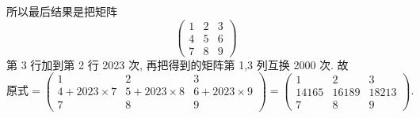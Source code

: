 \documentclass[../../main.tex]{subfiles}
\begin{document}
\begin{solution}
所以最后结果是把矩阵
\[
\begin{pmatrix} 
1 & 2 & 3 \\
4 & 5 & 6 \\
7 & 8 & 9 
\end{pmatrix}
\]
第 3 行加到第 2 行 2023 次, 再把得到的矩阵第 1,3 列互换 2000 次. 故
\[
\text{原式} = \begin{pmatrix} 
1 & 2 & 3 \\
4 + 2023 \times 7 & 5 + 2023 \times 8 & 6 + 2023 \times 9 \\
7 & 8 & 9 
\end{pmatrix} = \begin{pmatrix} 
1 & 2 & 3 \\
14165 & 16189 & 18213 \\
7 & 8 & 9 
\end{pmatrix}.
\]
\end{solution}
\end{document}
